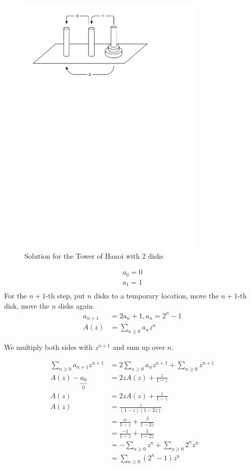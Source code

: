 \begin{figure}[htbp]
  \centering  \includegraphics[width=0.8\textwidth]{02_higher_combinatorics/pics/TowerOfHanoi}
  \caption{Solution for the Tower of Hanoi with 2 disks}
\end{figure}
\begin{align*}
  a_0 = 0 \\
  a_1 = 1 \\
\end{align*}
For the $n+1$-th step, put $n$ disks to a temporary location, move the $n+1$-th disk, move the $n$ disks again.
\begin{align*}
  a_{n+1} &= 2 a_n + 1, a_n = 2^n - 1\\
  A(z) &= \sum_{n \geq 0} a_n z^n
\end{align*}

We multiply both sides with $z^{n+1}$ and sum up over $n$.

\begin{align*}
\sum_{n≥0} a_{n+1} z^{n+1} &= 2 \sum_{n \geq 0} a_n z^{n+1} + \sum_{n\geq 0} z^{n+1} \\
A(z) - \underbrace{a_0}_{0} &= 2z A(z) + \frac{z}{1-z}\\
A(z) &= 2 z A(z) + \frac{z}{1-z}\\
A(z) &= \frac{z}{(1-z)(1-2z)} \\
    &= \frac{\alpha}{1-z} + \frac{\beta} {1-2z}\\
    &= \frac{-1}{1-z} + \frac{1}{1-2z} \\
    &= -\sum_{n\geq 0} z^n + \sum_{n\geq 0} 2^n z^n\\
    &= \sum_{n\geq 0} (2^n-1) z^n\\
\end{align*}

